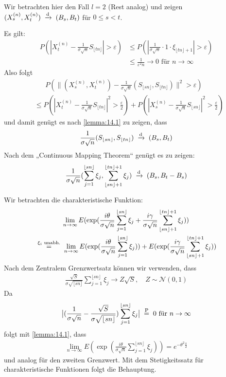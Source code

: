 \documentclass[a4paper,twoside,DIV15,BCOR12mm]{scrbook}
\begin{document}
\begin{beweis}
Wir betrachten hier den Fall $l=2$ (Rest analog) und zeigen $(X_s^{(n)}, X_t^{(n)}) \tonach d (B_s,B_t)$ für $0\le s < t$.

Es gilt:
\begin{align*}
P(|X_t^{(n)} - \frac 1 {\sigma \sqrt n} S_{\lfloor tn\rfloor}| > \varepsilon) &\le P(|\frac 1{\sigma\sqrt n} \cdot 1 \cdot  \xi_{\lfloor tn\rfloor +1}|>\varepsilon) \\
&\le \frac{1}{\varepsilon^2n} \to 0\text{ für }n\to\infty
\end{align*}
Also folgt
\begin{align*}
&\phantom{=.}P(\| (X_s^{(n)},X_t^{(n)}) - \frac 1 {\sigma \sqrt n}(S_{\lfloor sn\rfloor}, S_{\lfloor tn\rfloor})\|^2 >\varepsilon) \\
&\le P(|X_t^{(n)} - \frac1{\sigma \sqrt n} S_{\lfloor tn\rfloor}|^2 > \frac \varepsilon 2) +
P(|X_s^{(n)} - \frac1{\sigma \sqrt n} S_{\lfloor sn\rfloor}|^2 > \frac \varepsilon 2)
\end{align*}
und damit genügt es nach \ref{lemma:14.1} zu zeigen, dass 
\begin{align*}
\frac1{\sigma\sqrt n} (S_{\lfloor sn\rfloor}, S_{\lfloor tn\rfloor }) \tonach d (B_s,B_t)
\end{align*}
Nach dem „Continuous Mapping Theorem“ genügt es zu zeigen:
\begin{align*}
\frac1{\sigma\sqrt n} (\sum_{j=1}^{\lfloor sn\rfloor}\xi_j, \sum_{\lfloor sn\rfloor+1}^{\lfloor tn\rfloor+1}\xi_j) \tonach d (B_s,B_t-B_s)
\end{align*}

Wir betrachten die charakteristische Funktion:
\begin{multline*}
\lim_{n\to\infty} E(\exp(\frac{i\theta}{\sigma\sqrt n} \sum_{j=1}^{\lfloor sn\rfloor}\xi_j  + \frac{i\gamma}{\sigma\sqrt n} \sum_{\lfloor sn\rfloor+1}^{\lfloor tn\rfloor+1}\xi_j)) \\
\gleichnach{$\xi_i$ unabh.}
\lim_{n\to\infty} E(\exp(\frac{i\theta}{\sigma\sqrt n} \sum_{j=1}^{\lfloor sn\rfloor}\xi_j))  + E(\exp(\frac{i\gamma}{\sigma\sqrt n} \sum_{\lfloor sn\rfloor+1}^{\lfloor tn\rfloor+1}\xi_j))
\end{multline*}
Nach dem Zentralem Grenzwertsatz können wir verwenden, dass
\begin{align*}
\frac{\sqrt S}{\sigma \sqrt{\lfloor sn\rfloor}} \sum_{j=1}^{\lfloor sn\rfloor} \xi _j \to Z\sqrt S, \quad Z\sim \mathcal N(0,1)
\end{align*}
Da 
\begin{align*}
\big|(\frac{1}{\sigma \sqrt n} - \frac{\sqrt S}{\sigma\sqrt{\lfloor sn\rfloor}}) \sum_{j=1}^{\lfloor sn\rfloor}\xi_j\big| \gleichnach P 0 \text{ für } n\to \infty
\end{align*}
folgt mit \ref{lemma:14.1}, dass
\begin{align*}
\lim_{n\to\infty} E(\exp(\frac{i\theta}{\sigma\sqrt n} \sum_{j=1}^{\lfloor sn\rfloor}\xi_j)) = e^{-\theta^2 \frac s2}
\end{align*}
und analog für den zweiten Grenzwert. Mit dem Stetigkeitssatz für charakteristische Funktionen folgt die Behauptung.
\end{beweis}
\end{document}
